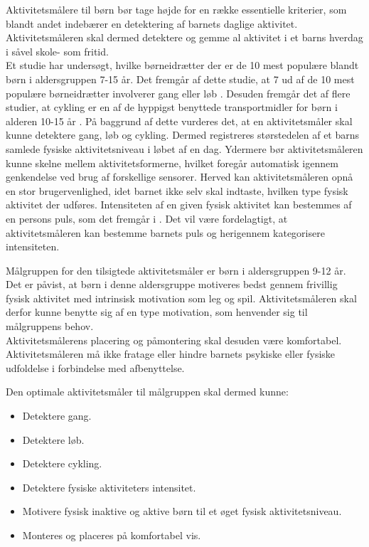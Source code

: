 Aktivitetsmålere til børn bør tage højde for en række essentielle kriterier, som blandt andet indebærer en detektering af barnets daglige aktivitet. Aktivitetsmåleren skal dermed detektere og gemme al aktivitet i et barns hverdag i såvel skole- som fritid.\\
Et studie har undersøgt, hvilke børneidrætter der er de 10 mest populære blandt børn i aldersgruppen 7-15 år. Det fremgår af dette studie, at 7 ud af de 10 mest populære børneidrætter involverer gang eller løb \citep{Asserhoej2013}. Desuden fremgår det af flere  studier, at cykling er en af de hyppigst benyttede transportmidler for børn i alderen 10-15 år \citep{DTU2014,COWI2015}. På baggrund af dette vurderes det, at en aktivitetsmåler skal kunne detektere gang, løb og cykling. Dermed registreres størstedelen af et barns samlede fysiske aktivitetsniveau i løbet af en dag. Ydermere bør aktivitetsmåleren kunne skelne mellem aktivitetsformerne, hvilket foregår automatisk igennem genkendelse ved brug af forskellige sensorer. Herved kan aktivitetsmåleren opnå en stor brugervenlighed, idet barnet ikke selv skal indtaste, hvilken type fysisk aktivitet der udføres. \newline
Intensiteten af en given fysisk aktivitet kan bestemmes af en persons puls, som det fremgår i . Det vil være fordelagtigt, at aktivitetsmåleren kan bestemme barnets puls og herigennem kategorisere intensiteten.

Målgruppen for den tilsigtede aktivitetsmåler er børn i aldersgruppen 9-12 år. Det er påvist, at børn i denne aldersgruppe motiveres bedst gennem frivillig fysisk aktivitet med intrinsisk motivation som leg og spil. Aktivitetsmåleren skal derfor kunne benytte sig af en type motivation, som henvender sig til målgruppens behov. \\
Aktivitetsmålerens placering og påmontering skal desuden være komfortabel. Aktivitetsmåleren må ikke fratage eller hindre barnets psykiske eller fysiske udfoldelse i forbindelse med afbenyttelse. 

Den optimale aktivitetsmåler til målgruppen skal dermed kunne: 
\begin{itemize}
\item Detektere gang.
\item Detektere løb.
\item Detektere cykling. %
\item Detektere fysiske aktiviteters intensitet. %
\item Motivere fysisk inaktive og aktive børn til et øget fysisk aktivitetsniveau. %
\item Monteres og placeres på komfortabel vis.
\end{itemize}

